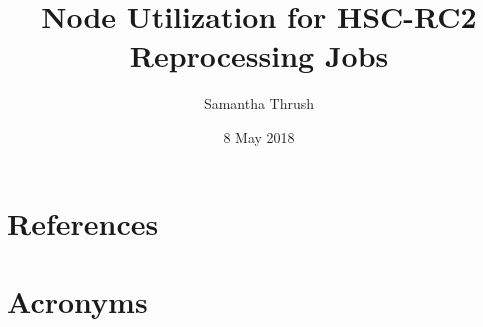 \documentclass[DM,authoryear,toc]{lsstdoc}
\title{Node Utilization for HSC-RC2 Reprocessing Jobs}
\author{%
Samantha Thrush
}
\date{8 May 2018}
\begin{document}
\maketitle



\appendix
\section{References} \label{sec:bib}
\renewcommand{\refname}{} %


\section{Acronyms} \label{sec:acronyms}

\end{document}
